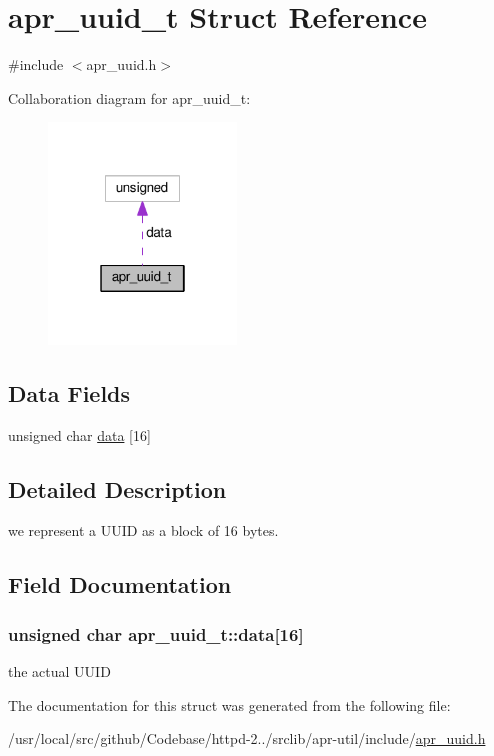 \hypertarget{structapr__uuid__t}{}\section{apr\+\_\+uuid\+\_\+t Struct Reference}
\label{structapr__uuid__t}


{\ttfamily \#include $<$apr\+\_\+uuid.\+h$>$}



Collaboration diagram for apr\+\_\+uuid\+\_\+t\+:
\nopagebreak
\begin{figure}[H]
\begin{center}
\leavevmode
\includegraphics[width=142pt]{structapr__uuid__t__coll__graph}
\end{center}
\end{figure}
\subsection*{Data Fields}
\begin{DoxyCompactItemize}
\item 
unsigned char \hyperlink{structapr__uuid__t_a8e3dadfe1bd9cbf26478127c4110e0d0}{data} \mbox{[}16\mbox{]}
\end{DoxyCompactItemize}


\subsection{Detailed Description}
we represent a U\+U\+ID as a block of 16 bytes. 

\subsection{Field Documentation}
\subsubsection[{\texorpdfstring{data}{data}}]{\setlength{\rightskip}{0pt plus 5cm}unsigned char apr\+\_\+uuid\+\_\+t\+::data\mbox{[}16\mbox{]}}\hypertarget{structapr__uuid__t_a8e3dadfe1bd9cbf26478127c4110e0d0}{}\label{structapr__uuid__t_a8e3dadfe1bd9cbf26478127c4110e0d0}
the actual U\+U\+ID 

The documentation for this struct was generated from the following file\+:\begin{DoxyCompactItemize}
\item 
/usr/local/src/github/\+Codebase/httpd-\/2../srclib/apr-\/util/include/\hyperlink{apr__uuid_8h}{apr\+\_\+uuid.\+h}\end{DoxyCompactItemize}
